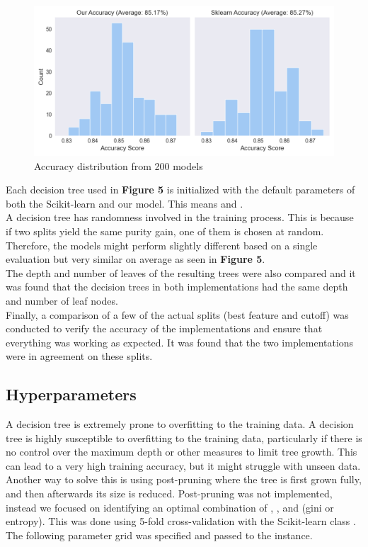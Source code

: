 \begin{figure}[H]
    \centering
    \includegraphics[scale=0.55]{figures_for_report/our_vs_sklearn_accuracy}
    \captionsetup{justification=centering,margin=2cm}
    \caption{Accuracy distribution from 200 models}
\end{figure}

Each decision tree used in \textbf{Figure 5} is initialized with the default parameters of both the Scikit-learn and our model.
This means  and .
\\A decision tree has randomness involved in the training process.
This is because if two splits yield the same purity gain, one of them is chosen at random.
Therefore, the models might perform slightly different based on a single evaluation but very similar on average as seen in \textbf{Figure 5}.\\

The depth and number of leaves of the resulting trees were also compared and it was found that the decision trees in both implementations had the same depth and number of leaf nodes.
\\

Finally, a comparison of a few of the actual splits (best feature and cutoff) was conducted to verify the accuracy of the implementations and ensure that everything was working as expected.
It was found that the two implementations were in agreement on these splits.

\subsection{Hyperparameters}
A decision tree is extremely prone to overfitting to the training data.
A decision tree is highly susceptible to overfitting to the training data, particularly if there is no control over the maximum depth or other measures to limit tree growth.
This can lead to a very high training accuracy, but it might struggle with unseen data.
Another way to solve this is using post-pruning where the tree is first grown fully, and then afterwards its size is reduced.
Post-pruning was not implemented, instead we focused on identifying an optimal combination of , , and  (gini or entropy).
This was done using 5-fold cross-validation with the Scikit-learn class .
The following parameter grid was specified and passed to the  instance.

